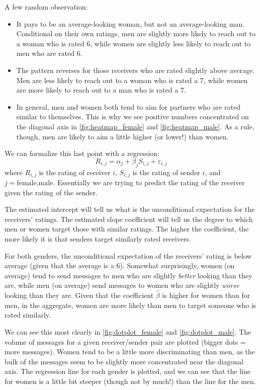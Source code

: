 A few random observation:
\begin{itemize}
\item It pays to be an average-looking woman, but not an average-looking man. Conditional on their own ratings, men are slightly more likely to reach out to a woman who is rated  6, while women are slightly less likely to reach out to men who are rated 6. 
\item The pattern reverses for those receivers who are rated slightly above average. Men are less likely to reach out to a woman who is rated a 7, while women are more likely to reach out to a man who is rated a 7.
\item In general, men and women both tend to aim for partners who are rated similar to themselves. This is why we see positive numbers concentrated on the diagonal axis in \cref{fig:heatmap_female} and \cref{fig:heatmap_male}. As a rule, though, men are likely to aim a little higher (or lower!) than women. 
\end{itemize}

We can formalize this last point with a regression:
\[ R_{i,j} = \alpha_j + \beta_j S_{i,j} + \varepsilon_{i,j} \]
where $R_{i,j}$ is the rating of receiver $i$, $S_{i,j}$ is the rating of sender $i$, and $j=\text{female,male}$. Essentially we are trying to predict the rating of the receiver given the rating of the sender.

The estimated intercept will tell us what is the unconditional expectation for the receivers' ratings. The estimated slope coefficient will tell us the degree to which men or women target those with similar ratings. The higher the coefficient, the more likely it is that senders target similarly rated receivers.



For both genders, the unconditional expectation of the receivers' rating is below average (given that the average is a 6). Somewhat surprisingly, women (on average) tend to send messages to men who are slightly \textit{better} looking than they are, while men (on average) send messages to women who are slightly \textit{worse} looking than they are. Given that the coefficient $\hat{\beta}$ is higher for women than for men, in the aggregate, women are more likely than men to target someone who is rated similarly.

We can see this most clearly in \cref{fig:dotplot_female} and \cref{fig:dotplot_male}. The volume of messages for a given receiver/sender pair are plotted (bigger dots = more messages). Women tend to be a little more discriminating than men, as the bulk of the messages seem to be slightly more concentrated near the diagonal axis. The regression line for each gender is plotted, and we can see that the line for women is a little bit steeper (though not by much!) than the line for the men.

